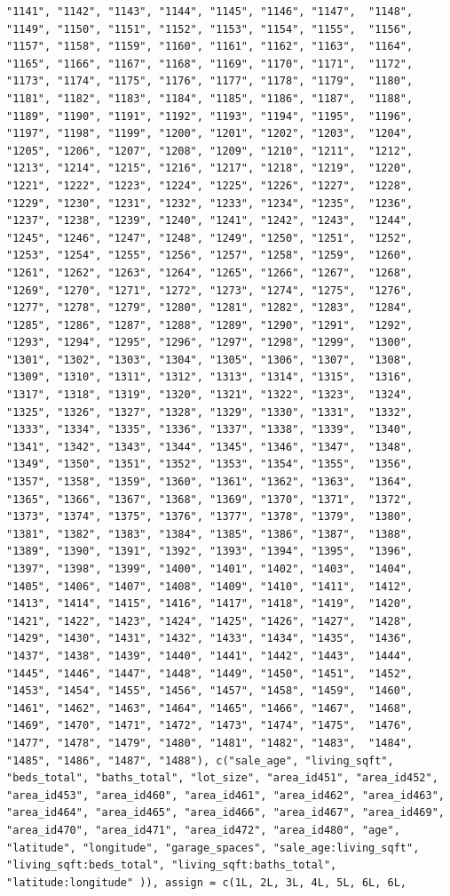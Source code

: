 \documentclass[
]{article}
\begin{document}
\begin{verbatim}
"1141", "1142", "1143", "1144", "1145", "1146", "1147",  "1148", "1149", "1150", "1151", "1152", "1153", "1154", "1155",  "1156", "1157", "1158", "1159", "1160", "1161", "1162", "1163",  "1164", "1165", "1166", "1167", "1168", "1169", "1170", "1171",  "1172", "1173", "1174", "1175", "1176", "1177", "1178", "1179",  "1180", "1181", "1182", "1183", "1184", "1185", "1186", "1187",  "1188", "1189", "1190", "1191", "1192", "1193", "1194", "1195",  "1196", "1197", "1198", "1199", "1200", "1201", "1202", "1203",  "1204", "1205", "1206", "1207", "1208", "1209", "1210", "1211",  "1212", "1213", "1214", "1215", "1216", "1217", "1218", "1219",  "1220", "1221", "1222", "1223", "1224", "1225", "1226", "1227",  "1228", "1229", "1230", "1231", "1232", "1233", "1234", "1235",  "1236", "1237", "1238", "1239", "1240", "1241", "1242", "1243",  "1244", "1245", "1246", "1247", "1248", "1249", "1250", "1251",  "1252", "1253", "1254", "1255", "1256", "1257", "1258", "1259",  "1260", "1261", "1262", "1263", "1264", "1265", "1266", "1267",  "1268", "1269", "1270", "1271", "1272", "1273", "1274", "1275",  "1276", "1277", "1278", "1279", "1280", "1281", "1282", "1283",  "1284", "1285", "1286", "1287", "1288", "1289", "1290", "1291",  "1292", "1293", "1294", "1295", "1296", "1297", "1298", "1299",  "1300", "1301", "1302", "1303", "1304", "1305", "1306", "1307",  "1308", "1309", "1310", "1311", "1312", "1313", "1314", "1315",  "1316", "1317", "1318", "1319", "1320", "1321", "1322", "1323",  "1324", "1325", "1326", "1327", "1328", "1329", "1330", "1331",  "1332", "1333", "1334", "1335", "1336", "1337", "1338", "1339",  "1340", "1341", "1342", "1343", "1344", "1345", "1346", "1347",  "1348", "1349", "1350", "1351", "1352", "1353", "1354", "1355",  "1356", "1357", "1358", "1359", "1360", "1361", "1362", "1363",  "1364", "1365", "1366", "1367", "1368", "1369", "1370", "1371",  "1372", "1373", "1374", "1375", "1376", "1377", "1378", "1379",  "1380", "1381", "1382", "1383", "1384", "1385", "1386", "1387",  "1388", "1389", "1390", "1391", "1392", "1393", "1394", "1395",  "1396", "1397", "1398", "1399", "1400", "1401", "1402", "1403",  "1404", "1405", "1406", "1407", "1408", "1409", "1410", "1411",  "1412", "1413", "1414", "1415", "1416", "1417", "1418", "1419",  "1420", "1421", "1422", "1423", "1424", "1425", "1426", "1427",  "1428", "1429", "1430", "1431", "1432", "1433", "1434", "1435",  "1436", "1437", "1438", "1439", "1440", "1441", "1442", "1443",  "1444", "1445", "1446", "1447", "1448", "1449", "1450", "1451",  "1452", "1453", "1454", "1455", "1456", "1457", "1458", "1459",  "1460", "1461", "1462", "1463", "1464", "1465", "1466", "1467",  "1468", "1469", "1470", "1471", "1472", "1473", "1474", "1475",  "1476", "1477", "1478", "1479", "1480", "1481", "1482", "1483",  "1484", "1485", "1486", "1487", "1488"), c("sale_age", "living_sqft",  "beds_total", "baths_total", "lot_size", "area_id451", "area_id452",  "area_id453", "area_id460", "area_id461", "area_id462", "area_id463",  "area_id464", "area_id465", "area_id466", "area_id467", "area_id469",  "area_id470", "area_id471", "area_id472", "area_id480", "age",  "latitude", "longitude", "garage_spaces", "sale_age:living_sqft",  "living_sqft:beds_total", "living_sqft:baths_total", "latitude:longitude" )), assign = c(1L, 2L, 3L, 4L, 5L, 6L, 6L, 
\end{verbatim}
\end{document}
